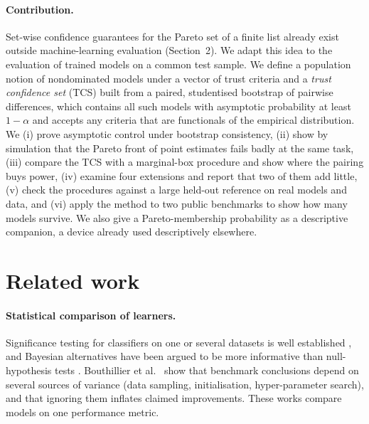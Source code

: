 \documentclass[11pt,a4paper]{article}
\begin{document}
\paragraph{Contribution.} Set-wise confidence guarantees for the Pareto set of a finite list already exist outside machine-learning evaluation (Section~2). We adapt this idea to the evaluation of trained models on a common test sample. We define a population notion of nondominated models under a vector of trust criteria and a \emph{trust confidence set} (TCS) built from a paired, studentised bootstrap of pairwise differences, which contains all such models with asymptotic probability at least $1-\alpha$ and accepts any criteria that are functionals of the empirical distribution. We (i) prove asymptotic control under bootstrap consistency, (ii) show by simulation that the Pareto front of point estimates fails badly at the same task, (iii) compare the TCS with a marginal-box procedure and show where the pairing buys power, (iv) examine four extensions and report that two of them add little, (v) check the procedures against a large held-out reference on real models and data, and (vi) apply the method to two public benchmarks to show how many models survive. We also give a Pareto-membership probability as a descriptive companion, a device already used descriptively elsewhere.

\section{Related work}
\paragraph{Statistical comparison of learners.} Significance testing for classifiers on one or several datasets is well established \citep{dietterich1998,demsar2006}, and Bayesian alternatives have been argued to be more informative than null-hypothesis tests \citep{benavoli2017}. Bouthillier et al.\ \citeyearpar{bouthillier2021} show that benchmark conclusions depend on several sources of variance (data sampling, initialisation, hyper-parameter search), and that ignoring them inflates claimed improvements. These works compare models on one performance metric.
\end{document}
